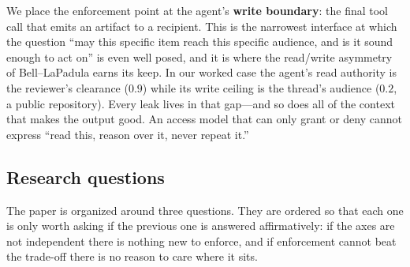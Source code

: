 \documentclass[conference,compsoc]{IEEEtran}
\begin{document}
We place the enforcement point at the agent's \textbf{write boundary}: the
final tool call that emits an artifact to a recipient. This is the narrowest
interface at which the question ``may this specific item reach this specific
audience, and is it sound enough to act on'' is even well posed, and it is
where the read/write asymmetry of Bell--LaPadula earns its keep. In our worked
case the agent's read authority is the reviewer's clearance ($0.9$) while its
write ceiling is the thread's audience ($0.2$, a public repository). Every leak
lives in that gap---and so does all of the context that makes the output good.
An access model that can only grant or deny cannot express ``read this, reason
over it, never repeat it.''

\subsection{Research questions}
\label{sec:intro:rqs}

The paper is organized around three questions. They are ordered so that each
one is only worth asking if the previous one is answered affirmatively: if the
axes are not independent there is nothing new to enforce, and if enforcement
cannot beat the trade-off there is no reason to care where it sits.
\end{document}
